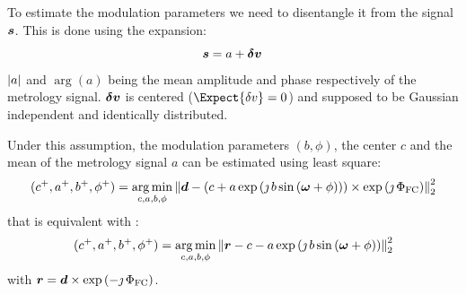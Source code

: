 \documentclass[a4paper,11pt,twoside]{scrartcl}
\begin{document}
To estimate the modulation parameters we need to disentangle it from the signal  $\boldsymbol{s}$. This is done using the expansion:
\begin{equation}
    \boldsymbol{s} = a  + \boldsymbol{\delta v}\,
\end{equation}
$\vert a\vert$  and $\arg{(a)}$ being the  mean amplitude and phase respectively of the metrology signal.  $ \boldsymbol{\delta v}$ is centered ($\Expect{\delta v}= 0$)  and supposed to be Gaussian independent and identically distributed.

Under this assumption, the modulation parameters $( b, \phi)$, the center $c$ and the mean of the metrology signal $a$ can be estimated using least square:
\begin{equation}
    (c^+, a^+, b^+, \phi^+) = \argmin_{c,a,b,\phi} \Norm{\V{d} -  \left(c + a \exp\left( \jmath \, b \sin\left( \V{\omega} + \phi\right)\right)\right)\times\exp\left(\jmath\,\Phi_\textrm{FC}\right) }_2^2
\end{equation}
that is equivalent with : 
\begin{equation}
    (c^+, a^+, b^+, \phi^+) = \argmin_{c,a,b,\phi} \Norm{\V{r} -  c - a \exp\left( \jmath \, b \sin\left( \V{\omega} + \phi\right)\right) }_2^2\label{eq:r}
\end{equation}
with $\boldsymbol{r} =\boldsymbol{d}\times\exp\left(-\jmath\,\Phi_\textrm{FC}\right)$.
\end{document}
